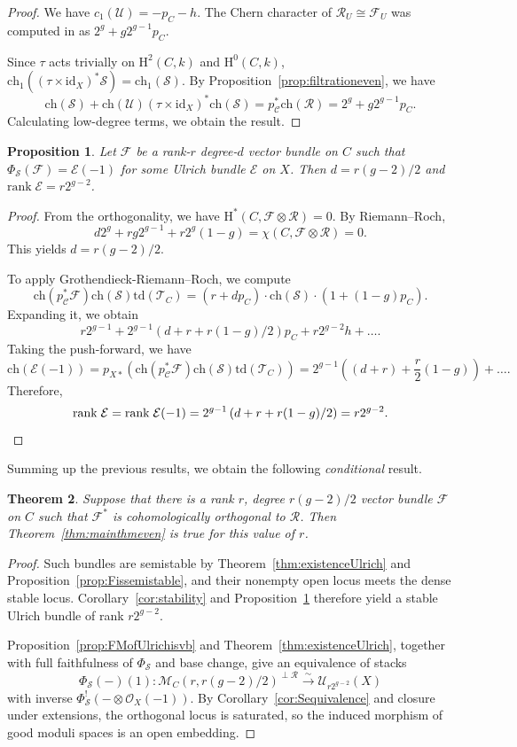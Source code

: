 \documentclass[12pt, letterpaper]{amsart}
\newtheorem{theorem}{Theorem}[section]
\newtheorem{proposition}[theorem]{Proposition}
\theoremstyle{definition}
\newcommand{\cC}{\mathcal{C} }
\newcommand{\cE}{\mathcal{E} }
\newcommand{\cF}{\mathcal{F} }
\newcommand{\cM}{\mathcal{M} }
\newcommand{\cO}{\mathcal{O} }
\newcommand{\cR}{\mathcal{R} }
\newcommand{\cS}{\mathcal{S} }
\newcommand{\cT}{\mathcal{T} }
\newcommand{\cU}{\mathcal{U} }
\newcommand{\rH}{\mathrm{H} }
\def\rank{\mathrm{rank}\;}
\def\ch{\mathrm{ch}}
\def\td{\mathrm{td}}
\begin{document}
\begin{proof}
We have \(c_1(\cU) = -p_C - h\). The Chern character of \(\cR_U \cong \cF_U\) was computed in \cite[Proposition~4.5]{ES25} as \(2^g + g2^{g-1}p_C\).

Since \(\tau\) acts trivially on \(\rH^2(C, k)\) and \(\rH^0(C, k)\), \(\ch_1((\tau \times \mathrm{id}_X)^*\cS) = \ch_1(\cS)\). By Proposition~\ref{prop:filtrationeven}, we have
\[\ch(\cS) + \ch(\cU)(\tau \times \mathrm{id}_X)^*\ch(\cS) = p_{\cC}^*\ch(\cR) = 2^g + g2^{g-1}p_C.\]
Calculating low-degree terms, we obtain the result.
\end{proof}

\begin{proposition}\label{prop:Ulrichrankeven}
Let \(\cF\) be a rank-\(r\) degree-\(d\) vector bundle on \(C\) such that \(\Phi_{\cS}(\cF) = \cE(-1)\) for some Ulrich bundle \(\cE\) on \(X\). Then \(d = r(g-2)/2\) and \(\rank \cE = r2^{g-2}\).
\end{proposition}

\begin{proof}
From the orthogonality, we have \(\rH^*(C, \cF \otimes \cR) = 0\). By Riemann--Roch,
\[d2^g + rg2^{g-1} + r2^g(1-g) = \chi(C, \cF \otimes \cR) = 0.\]
This yields \(d = r(g-2)/2\).

To apply Grothendieck-Riemann--Roch, we compute
\[\ch(p_{\cC}^*\cF)\ch(\cS)\td(\cT_C) = (r+dp_C)\cdot\ch(\cS)\cdot (1+(1-g)p_C).\]
Expanding it, we obtain
\[r2^{g-1} + 2^{g-1}\left(d+r+r(1-g)/2\right)p_C + r2^{g-2}h + \dots.\]
Taking the push-forward, we have
\[\ch(\cE(-1)) = p_{X*}(\ch(p_{\cC}^*\cF)\ch(\cS)\td(\cT_C)) = 2^{g-1}((d+r)+\frac{r}{2}(1-g)) + \dots.\]
Therefore,
\[\rank \cE = \rank \cE(-1) = 2^{g-1}\left(d+r+r(1-g)/2\right) = r2^{g-2}. \qedhere\]
\end{proof}

Summing up the previous results, we obtain the following \emph{conditional} result.

\begin{theorem}\label{thm:maintheoremevenconditional}
Suppose that there is a rank \(r\), degree \(r(g-2)/2\) vector bundle \(\cF\) on \(C\) such that \(\cF^*\) is cohomologically orthogonal to \(\cR\). Then Theorem~\ref{thm:mainthmeven} is true for this value of \(r\).
\end{theorem}

\begin{proof}
Such bundles are semistable by Theorem~\ref{thm:existenceUlrich} and Proposition~\ref{prop:Fissemistable}, and their nonempty open locus meets the dense stable locus. Corollary~\ref{cor:stability} and Proposition~\ref{prop:Ulrichrankeven} therefore yield a stable Ulrich bundle of rank \(r2^{g-2}\).

Proposition~\ref{prop:FMofUlrichisvb} and Theorem~\ref{thm:existenceUlrich}, together with full faithfulness of \(\Phi_{\cS}\) and base change, give an equivalence of stacks
\[\Phi_{\cS}(-)(1)\colon\cM_C(r,r(g-2)/2)^{\perp\cR}\xrightarrow{\sim}\cU_{r2^{g-2}}(X)\]
with inverse \(\Phi_{\cS}^!(-\otimes\cO_X(-1))\). By Corollary~\ref{cor:Sequivalence} and closure under extensions, the orthogonal locus is saturated, so the induced morphism of good moduli spaces is an open embedding.
\end{proof}
\end{document}
